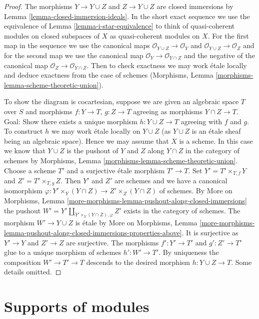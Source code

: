 \begin{proof}
The morphisms $Y \to Y \cup Z$ and $Z \to Y \cup Z$ are closed immersions
by Lemma \ref{lemma-closed-immersion-ideals}. In the short exact sequence
we use the equivalence of Lemma \ref{lemma-i-star-equivalence} to think of
quasi-coherent modules on closed subspaces of $X$ as quasi-coherent modules
on $X$. For the first map in the sequence we use the canonical maps
$\mathcal{O}_{Y \cup Z} \to \mathcal{O}_Y$ and
$\mathcal{O}_{Y \cup Z} \to \mathcal{O}_Z$
and for the second map we use the canonical map
$\mathcal{O}_Y \to \mathcal{O}_{Y \cap Z}$ and
the negative of the canonical map
$\mathcal{O}_Z \to \mathcal{O}_{Y \cap Z}$. Then to check
exactness we may work \'etale locally and deduce exactness
from the case of schemes
(Morphisms, Lemma \ref{morphisms-lemma-scheme-theoretic-union}).

\medskip\noindent
To show the diagram is cocartesian, suppose we are given an algebraic space
$T$ over $S$ and morphisms $f : Y \to T$, $g : Z \to T$ agreeing as morphisms
$Y \cap Z \to T$. Goal: Show there exists a unique morphism
$h : Y \cup Z \to T$ agreeing with $f$ and $g$.
To construct $h$ we may work \'etale locally on $Y \cup Z$
(as $Y \cup Z$ is an \'etale sheaf being an algebraic space).
Hence we may assume that $X$ is a scheme.
In this case we know that $Y \cup Z$ is the pushout
of $Y$ and $Z$ along $Y \cap Z$ in the category of schemes
by Morphisms, Lemma \ref{morphisms-lemma-scheme-theoretic-union}.
Choose a scheme $T'$ and a surjective \'etale morphism $T' \to T$.
Set $Y' = T' \times_{T, f} Y$ and $Z' = T' \times_{T, g} Z$.
Then $Y'$ and $Z'$ are schemes and we have a canonical isomorphism
$\varphi : Y' \times_Y (Y \cap Z) \to Z' \times_Z (Y \cap Z)$
of schemes. By More on Morphisms, Lemma
\ref{more-morphisms-lemma-pushout-along-closed-immersions}
the pushout $W' = Y' \amalg_{Y' \times_Y (Y \cap Z), \varphi} Z'$
exists in the category of schemes.
The morphism $W' \to Y \cup Z$ is \'etale by
More on Morphisms, Lemma
\ref{more-morphisms-lemma-pushout-along-closed-immersions-properties-above}.
It is surjective as $Y' \to Y$ and $Z' \to Z$ are surjective.
The morphisms $f' : Y' \to T'$ and $g' : Z' \to T'$
glue to a unique morphism of schemes $h' : W' \to T'$.
By uniqueness the composition $W' \to T' \to T$
descends to the desired morphism $h : Y \cup Z \to T$.
Some details omitted.
\end{proof}






\section{Supports of modules}
\label{section-support}

